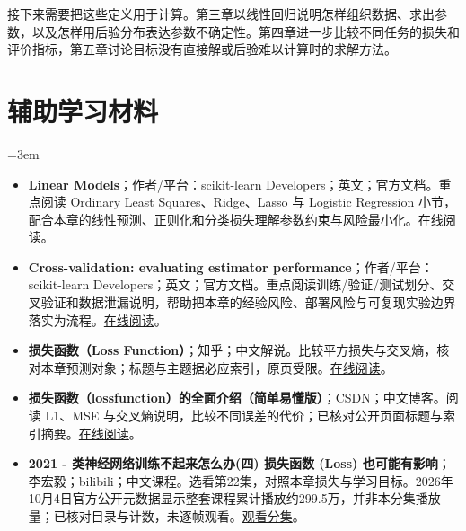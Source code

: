 接下来需要把这些定义用于计算。第三章以线性回归说明怎样组织数据、求出参数，以及怎样用后验分布表达参数不确定性。第四章进一步比较不同任务的损失和评价指标，第五章讨论目标没有直接解或后验难以计算时的求解方法。
\section*{辅助学习材料}
\begingroup
\emergencystretch=3em
\begin{itemize}
\item \textbf{Linear Models}；作者/平台：scikit-learn Developers；英文；官方文档。重点阅读 Ordinary Least Squares、Ridge、Lasso 与 Logistic Regression 小节，配合本章的线性预测、正则化和分类损失理解参数约束与风险最小化。\href{https://scikit-learn.org/stable/modules/linear\_model.html}{在线阅读}。
\item \textbf{Cross-validation: evaluating estimator performance}；作者/平台：scikit-learn Developers；英文；官方文档。重点阅读训练/验证/测试划分、交叉验证和数据泄漏说明，帮助把本章的经验风险、部署风险与可复现实验边界落实为流程。\href{https://scikit-learn.org/stable/modules/cross\_validation.html}{在线阅读}。
\item \textbf{损失函数（Loss Function）}；知乎；中文解说。比较平方损失与交叉熵，核对本章预测对象；标题与主题据必应索引，原页受限。\href{https://zhuanlan.zhihu.com/p/261059231}{在线阅读}。
\item \textbf{损失函数（lossfunction）的全面介绍（简单易懂版）}；CSDN；中文博客。阅读 L1、MSE 与交叉熵说明，比较不同误差的代价；已核对公开页面标题与索引摘要。\href{https://blog.csdn.net/weixin\_57643648/article/details/122704657}{在线阅读}。
\item \textbf{2021 - 类神经网络训练不起来怎么办(四) 损失函数 (Loss) 也可能有影响}；李宏毅；bilibili；中文课程。选看第22集，对照本章损失与学习目标。2026年10月4日官方公开元数据显示整套课程累计播放约299.5万，并非本分集播放量；已核对目录与计数，未逐帧观看。\href{https://www.bilibili.com/video/BV1Wv411h7kN/?p=22}{观看分集}。
\end{itemize}
\endgroup

